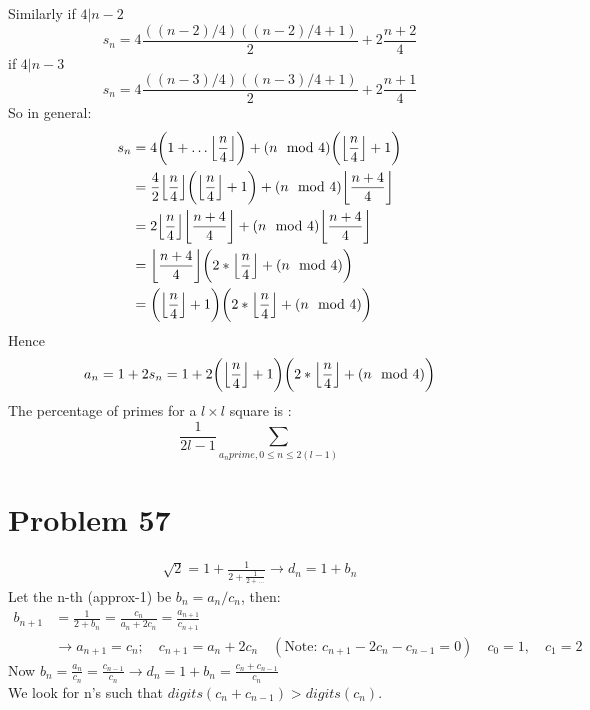 \documentclass[12pt]{article}
\DeclarePairedDelimiter\floor{\lfloor}{\rfloor}
\begin{document}
Similarly if $4|n-2$
$$
    s_n = 4\frac{((n-2)/4)((n-2)/4+1)}{2} + 2\frac{n+2}{4}
$$
if $4|n-3$
$$
    s_n = 4\frac{((n-3)/4)((n-3)/4+1)}{2} + 2\frac{n+1}{4}
$$
So in general:
\begin{align*}
    s_n &= 4\bigg(1 + \ldots \floor*{\frac{n}{4}}\bigg) + (n\mod 4) \bigg(\floor*{\frac{n}{4}}+1\bigg)\\
    &= \frac{4}{2} \floor*{\frac{n}{4}} \bigg(\floor*{\frac{n}{4}}+1\bigg) + (n\mod 4) \floor*{\frac{n+4}{4}}\\
    &= 2 \floor*{\frac{n}{4}} \floor*{\frac{n+4}{4}} + (n\mod 4) \floor*{\frac{n+4}{4}}\\
    &= \floor*{\frac{n+4}{4}} \bigg( 2*\floor*{\frac{n}{4}}+ (n \mod 4)\bigg) \\
    &= \bigg(\floor*{\frac{n}{4}}+1\bigg) \bigg( 2*\floor*{\frac{n}{4}}+ (n \mod 4)\bigg) \\
\end{align*}
Hence
$$
    a_n = 1+2s_n = 1+2\bigg(\floor*{\frac{n}{4}}+1\bigg) \bigg( 2*\floor*{\frac{n}{4}}+ (n \mod 4)\bigg)
$$
The percentage of primes for a $l\times l$ square is :
$$
    \frac{1}{2l-1} \sum_{a_n prime, 0 \leq n \leq 2(l-1)}
$$
\section*{Problem 57}
\begin{align*}
    \sqrt{2} = 1 +\frac{1}{2+\frac{1}{2+\ldots}} \rightarrow d_n = 1 + b_n
\end{align*}
Let the n-th (approx-1) be $b_n = a_n/c_n$, then:
\begin{align*}
    b_{n+1} &= \frac{1}{2+b_n} = \frac{c_n}{a_n+2c_n} = \frac{a_{n+1}}{c_{n+1}}\\
    &\rightarrow a_{n+1} = c_n; \quad c_{n+1} = a_n + 2c_n
    \quad  (\text{Note: }c_{n+1}-2c_n-c_{n-1} = 0) \quad c_0 = 1, \quad c_1 = 2
\end{align*}
Now $b_n = \frac{a_n}{c_n} = \frac{c_{n-1}}{c_n} \rightarrow d_n = 1 +b_n = \frac{c_n+c_{n-1}}{c_n}$\\
We look for n's such that $digits(c_n+c_{n-1}) > digits(c_n)$.
\end{document}
